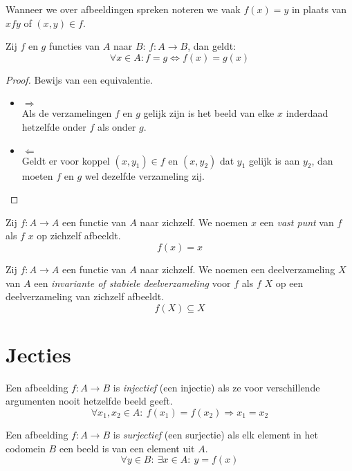 \documentclass[main.tex]{subfiles}
\begin{document}
\begin{de}
  Wanneer we over afbeeldingen spreken noteren we vaak $f(x) = y$ in plaats van $x f y$ of $(x,y) \in f$.
\end{de}


\begin{st}
  Zij $f$ en $g$ functies van $A$ naar $B$: $f: A \rightarrow B$, dan geldt:
  \[ \forall x \in A: f = g \Leftrightarrow f(x) = g(x) \]  
  \begin{proof}
    Bewijs van een equivalentie.
    \begin{itemize}
    \item $\Rightarrow$\\
      Als de verzamelingen $f$ en $g$ gelijk zijn is het beeld van elke $x$ inderdaad hetzelfde onder $f$ als onder $g$.
    \item $\Leftarrow$\\
      Geldt er voor koppel $(x,y_{1}) \in f$ en $(x,y_{2})$ dat $y_{1}$ gelijk is aan $y_{2}$, dan moeten $f$ en $g$ wel dezelfde verzameling zij.
    \end{itemize}
  \end{proof}
\end{st}

\begin{de}
  Zij $f: A \rightarrow A$ een functie van $A$ naar zichzelf.
  We noemen $x$ een \emph{vast punt} van $f$ als $f$ $x$ op zichzelf afbeeldt.
  \[ f(x) = x \]
\end{de}

\begin{de}
  Zij $f: A \rightarrow A$ een functie van $A$ naar zichzelf.
  We noemen een deelverzameling $X$ van $A$ een \emph{invariante of stabiele deelverzameling} voor $f$ als $f$ $X$ op een deelverzameling van zichzelf afbeeldt.
  \[ f(X) \subseteq X \]
\end{de}

\section{Jecties}
\label{sec:jecties}

\begin{de}
  Een afbeelding $f: A \rightarrow B$ is \emph{injectief} (een injectie) als ze voor verschillende argumenten nooit hetzelfde beeld geeft.
  \[ \forall x_{1},x_{2} \in A:\ f(x_{1}) = f(x_{2}) \Rightarrow x_{1}= x_{2} \]
\end{de}

\begin{de}
  Een afbeelding $f: A \rightarrow B$ is \emph{surjectief} (een surjectie) als elk element in het codomein $B$ een beeld is van een element uit $A$.
  \[ \forall y \in B:\ \exists x \in A:\ y = f(x) \]
\end{de}
\end{document}
